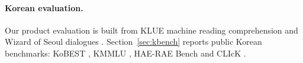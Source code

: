 \paragraph{Korean evaluation.}
Our product evaluation is built from KLUE machine reading comprehension and Wizard of Seoul
dialogues \citep{park2021klue}. Section~\ref{sec:kbench} reports public Korean
benchmarks: KoBEST \citep{kim2022kobest}, KMMLU \citep{son2024kmmlu}, HAE-RAE Bench
\citep{son2023haerae} and CLIcK \citep{kim2024click}.
